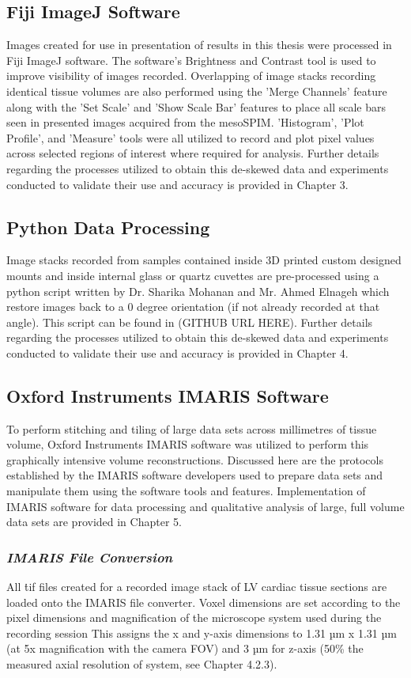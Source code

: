 \subsection{Fiji ImageJ Software}
Images created for use in presentation of results in this thesis were processed in Fiji ImageJ software. The software's Brightness and Contrast tool is used to improve visibility of images recorded. Overlapping of image stacks recording identical tissue volumes are also performed using the 'Merge Channels' feature along with the 'Set Scale' and 'Show Scale Bar' features to place all scale bars seen in presented images acquired from the mesoSPIM. 'Histogram', 'Plot Profile', and 'Measure' tools were all utilized to record and plot pixel values across selected regions of interest where required for analysis. Further details regarding the processes utilized to obtain this de-skewed data and experiments conducted to validate their use and accuracy is provided in Chapter 3.

\subsection{Python Data Processing}
Image stacks recorded from samples contained inside 3D printed custom designed mounts and inside internal glass or quartz cuvettes are pre-processed using a python script written by Dr. Sharika Mohanan and Mr. Ahmed Elnageh which restore images back to a 0 degree orientation (if not already recorded at that angle). This script can be found in (GITHUB URL HERE). Further details regarding the processes utilized to obtain this de-skewed data and experiments conducted to validate their use and accuracy is provided in Chapter 4.

\subsection{Oxford Instruments IMARIS Software}
To perform stitching and tiling of large data sets across millimetres of tissue volume, Oxford Instruments IMARIS software was utilized to perform this graphically intensive volume reconstructions. Discussed here are the protocols established by the IMARIS software developers used to prepare data sets and manipulate them using the software tools and features. Implementation of IMARIS software for data processing and qualitative analysis of large, full volume data sets are provided in Chapter 5.


\subsubsection{\textit{IMARIS File Conversion}}
All \.tif files created for a recorded image stack of LV cardiac tissue sections are loaded onto the IMARIS file converter. Voxel dimensions are set according to the pixel dimensions and magnification of the microscope system used during the recording session This assigns the x and y-axis dimensions  to 1.31 µm x 1.31 µm (at 5x magnification with the camera FOV) and 3 µm for z-axis (50\% the measured axial resolution of system, see Chapter 4.2.3). 

